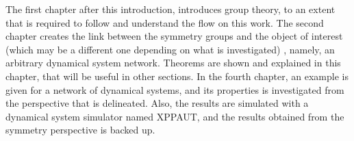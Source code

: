 The first chapter after this introduction, introduces group theory, to an extent that is required to follow and understand the flow on this work. The second chapter creates the link between the symmetry groups and the object of interest (which may be a different one depending on what is investigated) , namely, an arbitrary dynamical system network. Theorems are shown and explained in this chapter, that will be useful in other sections. In the fourth chapter, an example is given for a network of dynamical systems, and its properties is investigated from the perspective that is delineated. Also, the results are simulated with a dynamical system simulator named XPPAUT, and the results obtained from the symmetry perspective is backed up.
